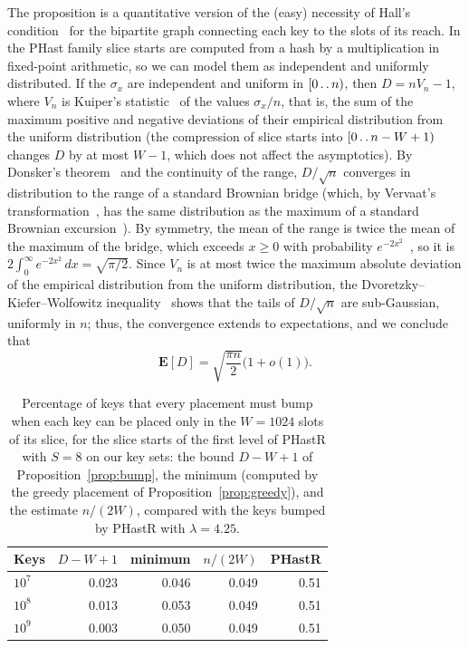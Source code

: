 \documentclass[11pt]{article}
\def\..{\,\mathpunct{\ldotp\ldotp}} %
\newcommand{\PHast}{PHast\xspace}
\newcommand{\PHastR}{PHastR\xspace}
\begin{document}
The proposition is a quantitative version of the (easy) necessity of Hall's
condition~\cite{HalORS} for the bipartite graph connecting each key to the
slots of its reach. In the \PHast family slice starts are computed from a
hash by a multiplication in fixed-point arithmetic, so we can model them as
independent and uniformly distributed. If the $\sigma_x$ are independent and
uniform in $[0\..n)$, then $D=nV_n-1$, where $V_n$ is Kuiper's
statistic~\cite{KuiTCRPC} of the values $\sigma_x/n$, that is, the sum of the
maximum positive and negative deviations of their empirical distribution from
the uniform distribution (the compression of slice starts into
$[0\..n-W+1)$ changes $D$ by at most $W-1$, which does not affect the
asymptotics). By Donsker's theorem~\cite{BilCPM} and the continuity of the
range, $D/\sqrt n$ converges in distribution to the range of a standard
Brownian bridge (which, by Vervaat's transformation~\cite{VerRBBBE}, has the
same distribution as the maximum of a standard Brownian
excursion~\cite{KenDMBE}). By symmetry, the mean of the range is twice the
mean of the maximum of the bridge, which exceeds $x\geq0$ with probability
$e^{-2x^2}$~\cite{BilCPM}, so it is $2\int_0^\infty
e^{-2x^2}\,dx=\sqrt{\pi/2}$. Since $V_n$ is at most twice the maximum absolute
deviation of the empirical distribution from the uniform distribution, the
Dvoretzky--Kiefer--Wolfowitz inequality~\cite{MasTCDKWI} shows that the tails
of $D/\sqrt n$ are sub-Gaussian, uniformly in $n$; thus, the convergence
extends to expectations, and we conclude that
\[
\mathbf E[D]=\sqrt{\frac{\pi n}2}\bigl(1+o(1)\bigr).
\]

\begin{table}[t]
\small
\begin{tabular}{lrrrr}
\toprule
Keys & $D-W+1$ & minimum & $n/(2W)$ & \PHastR \\
\midrule
$10^7$ & 0.023 & 0.046 & 0.049 & 0.51 \\
$10^8$ & 0.013 & 0.053 & 0.049 & 0.51 \\
$10^9$ & 0.003 & 0.050 & 0.049 & 0.51 \\
\bottomrule
\end{tabular}
\centering
\caption{Percentage of keys that every placement must bump when each key can
be placed only in the $W=1024$ slots of its slice, for the slice starts of the
first level of \PHastR with $S=8$ on our key sets: the bound $D-W+1$ of
Proposition~\ref{prop:bump}, the minimum (computed by the greedy placement of
Proposition~\ref{prop:greedy}),
and the estimate $n/(2W)$, compared with the keys bumped by \PHastR with
$\lambda=4.25$.}
\label{tab:floor}
\end{table}
\end{document}
